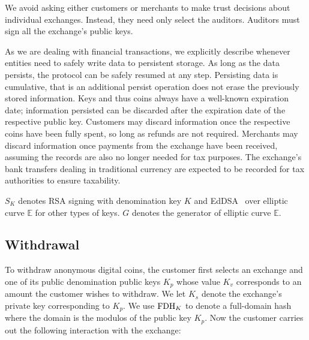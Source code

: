 \documentclass[sigconf, authordraft]{acmart}
\begin{document}
We avoid asking either customers or merchants to make trust decisions
about individual exchanges.  Instead, they need only select the auditors.
Auditors must sign all the exchange's public keys.

As we are dealing with financial transactions, we explicitly describe
whenever entities need to safely write data to persistent storage.
As long as the data persists, the protocol can be safely
resumed at any step.  Persisting data is cumulative, that is an
additional persist operation does not erase the previously stored
information.  Keys and thus coins always have a well-known expiration
date; information persisted can be discarded after the
expiration date of the respective public key.
Customers may discard information once the respective coins have been
fully spent, so long as refunds are not required.
Merchants may discard information once payments from the exchange have
been received, assuming the records are also no longer needed for tax
purposes.  The exchange's bank transfers dealing in traditional currency
are expected to be recorded for tax authorities to ensure taxability.

$S_K$ denotes RSA signing with denomination key $K$ and EdDSA~\cite{eddsa,rfc8032}
over elliptic curve $\mathbb{E}$ for other types of keys.
$G$ denotes the generator of elliptic curve $\mathbb{E}$.

\subsection{Withdrawal}

To withdraw anonymous digital coins, the customer first selects an
exchange and one of its public denomination public keys $K_p$ whose
value $K_v$ corresponds to an amount the customer wishes to withdraw.
We let $K_s$ denote the exchange's private key corresponding to $K_p$.
We use $\textrm{FDH}_K$ to denote a full-domain hash where the domain is the
modulos of the public key $K_p$.  Now the customer carries out the
following interaction with the exchange:

\end{document}
